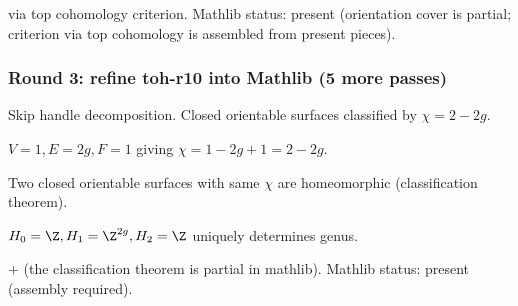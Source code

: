 \begin{lemma}
\label{lem:tmo-r15}
 via top cohomology criterion.  Mathlib status: present (orientation cover is partial; criterion via top cohomology is assembled from present pieces).
\leanok\mathlibok
\end{lemma}

\subsubsection*{Round 3: refine toh-r10 into Mathlib (5 more passes)}

\begin{lemma}
\label{lem:toh-r11}
Skip handle decomposition.  Closed orientable surfaces classified by $\chi = 2-2g$.
\leanok\mathlibok
\end{lemma}

\begin{lemma}[Pass toh.12: standard $4g$-gon model has $\chi = 2-2g$]
\label{lem:toh-r12}
$V=1, E=2g, F=1$ giving $\chi = 1 - 2g + 1 = 2-2g$.
\leanok
\end{lemma}

\begin{lemma}
\label{lem:toh-r13}
Two closed orientable surfaces with same $\chi$ are homeomorphic (classification theorem).
\leanok
\end{lemma}

\begin{lemma}
\label{lem:toh-r14}
$H_{0} = \Z, H_{1} = \Z^{2g}, H_{2} = \Z$ uniquely determines genus.
\leanok
\end{lemma}

\begin{lemma}
\label{lem:toh-r15}
 +  (the classification theorem is partial in mathlib).  Mathlib status: present (assembly required).
\leanok\mathlibok
\end{lemma}

